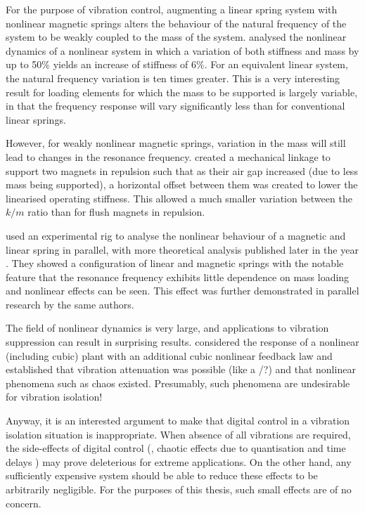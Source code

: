For the purpose of vibration control, augmenting a linear spring system with
nonlinear magnetic springs alters the behaviour of the natural frequency of
the system to be weakly coupled to the mass of the system.
\textcite{dangola2006} analysed the nonlinear dynamics of a nonlinear system
in which a variation of both stiffness and mass by up to 50\% yields an
increase of stiffness of 6\%. For an equivalent linear system, the natural
frequency variation is ten times greater. This is a very interesting result
for loading elements for which the mass to be supported is largely variable,
in that the frequency response will vary significantly less than for
conventional linear springs.

However, for weakly nonlinear magnetic springs, variation in the mass will
still lead to changes in the resonance frequency. \textcite{todaka2001}
created a mechanical linkage to support two magnets in repulsion such that as
their air gap increased (due to less mass being supported), a horizontal
offset between them was created to lower the linearised operating stiffness.
This allowed a much smaller variation between the $k/m$ ratio than for flush
magnets in repulsion.

\textcite{bonisoli2007} used an experimental rig to analyse the nonlinear
behaviour of a magnetic and linear spring in parallel, with more theoretical
analysis published later in the year \cite{bonisoli2007b}. They showed a
configuration of linear and magnetic springs with the notable feature that the
resonance frequency exhibits little dependence on mass loading and nonlinear
effects can be seen. This effect was further demonstrated in parallel research
by the same authors.

The field of nonlinear dynamics is very large, and applications to vibration
suppression can result in surprising results. \textcite{oueini1999} considered
the response of a nonlinear (including cubic) plant with an additional cubic
nonlinear feedback law and established that vibration attenuation was possible
(like a \vibneut/?) and that nonlinear phenomena such as chaos existed.
Presumably, such phenomena are undesirable for vibration isolation!


\cite{zuo2004}

Anyway, it is an interested argument to make that digital control in a
vibration isolation situation is inappropriate. When absence of all
vibrations are required, the side-effects of digital control (\ie,
chaotic effects due to quantisation and time delays
\cite{csernak2007}) may prove deleterious for extreme applications. On
the other hand, any sufficiently expensive system should be able to
reduce these effects to be arbitrarily negligible. For the purposes of
this thesis, such small effects are of no concern.


